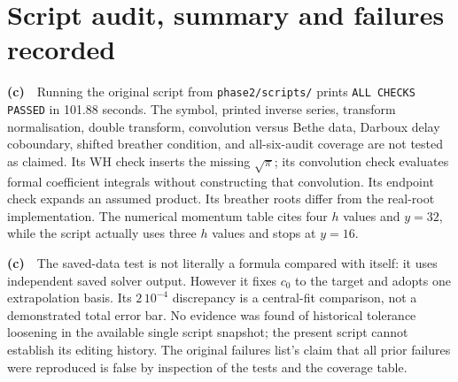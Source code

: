 \documentclass[11pt,a4paper]{article}
\newcommand{\Lc}{\textbf{(c)}\ }
\begin{document}
\section{Script audit, summary and failures recorded}
\Lc\ Running the original script from \texttt{phase2/scripts/} prints
\texttt{ALL CHECKS PASSED} in 101.88 seconds. The symbol, printed inverse
series, transform normalisation, double transform, convolution versus Bethe
data, Darboux delay coboundary, shifted breather condition, and all-six-audit
coverage are not tested as claimed. Its WH check inserts the missing
$\sqrt\pi$; its convolution check evaluates formal coefficient integrals
without constructing that convolution. Its endpoint check expands an assumed
product. Its breather roots differ from the real-root implementation.
The numerical momentum table cites four $h$ values and $y=32$, while the
script actually uses three $h$ values and stops at $y=16$.

\Lc\ The saved-data test is not literally a formula compared with itself:
it uses independent saved solver output. However it fixes $c_0$ to the target
and adopts one extrapolation basis. Its $2\,10^{-4}$ discrepancy is a central-fit
comparison, not a demonstrated total error bar. No evidence was found of
historical tolerance loosening in the available single script snapshot;
the present script cannot establish its editing history. The original
failures list's claim that all prior failures were reproduced is false by
inspection of the tests and the coverage table.
\end{document}
